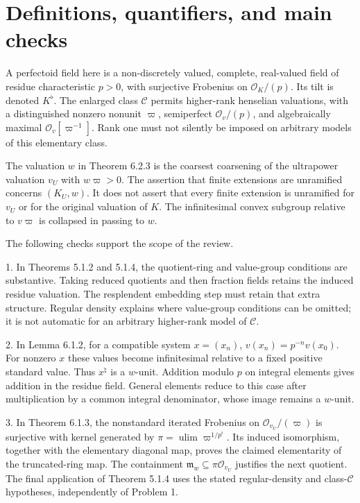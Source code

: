 \documentclass[10pt]{article}
\begin{document}
\section*{Definitions, quantifiers, and main checks}
A perfectoid field here is a non-discretely valued, complete, real-valued field of residue characteristic \(p>0\), with surjective Frobenius on \(\mathcal O_K/(p)\). Its tilt is denoted \(K^\flat\). The enlarged class \(\mathcal C\) permits higher-rank henselian valuations, with a distinguished nonzero nonunit \(\varpi\), semiperfect \(\mathcal O_v/(p)\), and algebraically maximal \(\mathcal O_v[\varpi^{-1}]\). Rank one must not silently be imposed on arbitrary models of this elementary class.\par
The valuation \(w\) in Theorem 6.2.3 is the coarsest coarsening of the ultrapower valuation \(v_U\) with \(w\varpi>0\). The assertion that finite extensions are unramified concerns \((K_U,w)\). It does not assert that every finite extension is unramified for \(v_U\) or for the original valuation of \(K\). The infinitesimal convex subgroup relative to \(v\varpi\) is collapsed in passing to \(w\).\par
The following checks support the scope of the review.\par
1. In Theorems 5.1.2 and 5.1.4, the quotient-ring and value-group conditions are substantive. Taking reduced quotients and then fraction fields retains the induced residue valuation. The resplendent embedding step must retain that extra structure. Regular density explains where value-group conditions can be omitted; it is not automatic for an arbitrary higher-rank model of \(\mathcal C\).\par
2. In Lemma 6.1.2, for a compatible system \(x=(x_n)\), \(v(x_n)=p^{-n}v(x_0)\). For nonzero \(x\) these values become infinitesimal relative to a fixed positive standard value. Thus \(x^\natural\) is a \(w\)-unit. Addition modulo \(p\) on integral elements gives addition in the residue field. General elements reduce to this case after multiplication by a common integral denominator, whose image remains a \(w\)-unit.\par
3. In Theorem 6.1.3, the nonstandard iterated Frobenius on \(\mathcal O_{v_U}/(\varpi)\) is surjective with kernel generated by \(\pi=\operatorname{ulim}\varpi^{1/p^i}\). Its induced isomorphism, together with the elementary diagonal map, proves the claimed elementarity of the truncated-ring map. The containment \(\mathfrak m_w\subseteq\pi\mathcal O_{v_U}\) justifies the next quotient. The final application of Theorem 5.1.4 uses the stated regular-density and class-\(\mathcal C\) hypotheses, independently of Problem 1.\par
\end{document}
